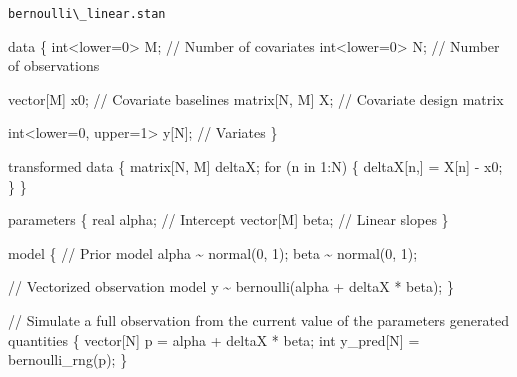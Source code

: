 \documentclass[
  letterpaper,
  DIV=11,
  numbers=noendperiod]{scrartcl}
\newenvironment{Shaded}{\begin{snugshade}}{\end{snugshade}}
\newcommand{\CommentTok}[1]{\textcolor[rgb]{0.37,0.37,0.37}{#1}}
\newcommand{\ControlFlowTok}[1]{\textcolor[rgb]{0.00,0.23,0.31}{#1}}
\newcommand{\DataTypeTok}[1]{\textcolor[rgb]{0.68,0.00,0.00}{#1}}
\newcommand{\DecValTok}[1]{\textcolor[rgb]{0.68,0.00,0.00}{#1}}
\newcommand{\KeywordTok}[1]{\textcolor[rgb]{0.00,0.23,0.31}{#1}}
\newcommand{\NormalTok}[1]{\textcolor[rgb]{0.00,0.23,0.31}{#1}}
\begin{document}
\begin{codelisting}

\caption{\texttt{bernoulli\textbackslash\_linear.stan}}

\begin{Shaded}
\begin{Highlighting}[]
\KeywordTok{data}\NormalTok{ \{}
  \DataTypeTok{int}\NormalTok{\textless{}}\KeywordTok{lower}\NormalTok{=}\DecValTok{0}\NormalTok{\textgreater{} M; }\CommentTok{// Number of covariates}
  \DataTypeTok{int}\NormalTok{\textless{}}\KeywordTok{lower}\NormalTok{=}\DecValTok{0}\NormalTok{\textgreater{} N; }\CommentTok{// Number of observations}
  
  \DataTypeTok{vector}\NormalTok{[M] x0;   }\CommentTok{// Covariate baselines}
  \DataTypeTok{matrix}\NormalTok{[N, M] X; }\CommentTok{// Covariate design matrix}
  
  \DataTypeTok{int}\NormalTok{\textless{}}\KeywordTok{lower}\NormalTok{=}\DecValTok{0}\NormalTok{, }\KeywordTok{upper}\NormalTok{=}\DecValTok{1}\NormalTok{\textgreater{} y[N]; }\CommentTok{// Variates}
\NormalTok{\}}

\KeywordTok{transformed data}\NormalTok{ \{}
  \DataTypeTok{matrix}\NormalTok{[N, M] deltaX;}
  \ControlFlowTok{for}\NormalTok{ (n }\ControlFlowTok{in} \DecValTok{1}\NormalTok{:N) \{}
\NormalTok{    deltaX[n,] = X[n] {-} x0\textquotesingle{};}
\NormalTok{  \}}
\NormalTok{\}}

\KeywordTok{parameters}\NormalTok{ \{}
  \DataTypeTok{real}\NormalTok{ alpha;      }\CommentTok{// Intercept}
  \DataTypeTok{vector}\NormalTok{[M] beta;  }\CommentTok{// Linear slopes}
\NormalTok{\}}

\KeywordTok{model}\NormalTok{ \{}
  \CommentTok{// Prior model}
\NormalTok{  alpha \textasciitilde{} normal(}\DecValTok{0}\NormalTok{, }\DecValTok{1}\NormalTok{);}
\NormalTok{  beta \textasciitilde{} normal(}\DecValTok{0}\NormalTok{, }\DecValTok{1}\NormalTok{);}

  \CommentTok{// Vectorized observation model}
\NormalTok{  y \textasciitilde{} bernoulli(alpha + deltaX * beta);}
\NormalTok{\}}

\CommentTok{// Simulate a full observation from the current value of the parameters}
\KeywordTok{generated quantities}\NormalTok{ \{}
  \DataTypeTok{vector}\NormalTok{[N] p = alpha + deltaX * beta;}
  \DataTypeTok{int}\NormalTok{ y\_pred[N] = bernoulli\_rng(p);}
\NormalTok{\}}
\end{Highlighting}
\end{Shaded}

\end{codelisting}
\end{document}
